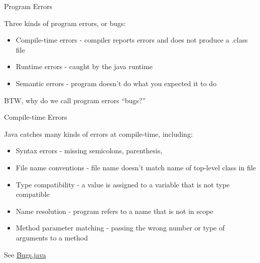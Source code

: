 \documentclass{beamer}
\author[Chris Simpkins] 
{Christopher Simpkins \\\texttt{chris.simpkins@gatech.edu}}
\institute[Georgia Tech] %
\date[CS 1331]{}
\title[\course] %
{\lesson}
\subtitle{}
\newcommand{\code}{http://www.cc.gatech.edu/~simpkins/teaching/gatech/cs1331/code}
\begin{document}
\begin{frame}
  \titlepage
\end{frame}



\begin{frame}[fragile]{Program Errors}


Three kinds of program errors, or bugs:
\begin{itemize}
\item Compile-time errors - compiler reports errors and does not produce a .class file
\item Runtime errors - caught by the java runtime
\item Semantic errors - program doesn't do what you expected it to do
\end{itemize}
\vspace{.2in}
BTW, why do we call program errors ``bugs?''

\end{frame}

\begin{frame}[fragile]{Compile-time Errors}


Java catches many kinds of errors at compile-time, including:
\begin{itemize}
\item Syntax errors - missing semicolons, parenthesis, 
\item File name conventions - file name doesn't match name of top-level class in file
\item Type compatibility - a value is assigned to a variable that is not type compatible
\item Name resolution - program refers to a name that is not in scope
\item Method parameter matching - passing the wrong number or type of arguments to a method
\end{itemize}

\vspace{.2in}
See \href{\code/Bugs.java}{Bugs.java}

\end{frame}
\end{document}

